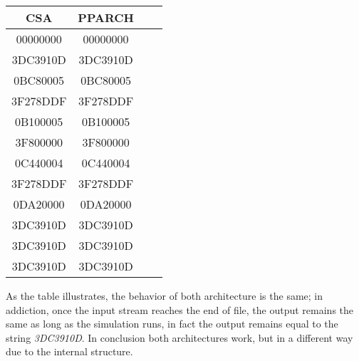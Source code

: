 \begin{table}[H]
\begin{center}
\begin{tabular}{|c|c|c|c|}				\hline
CSA		 	  & PPARCH 					\\ \hline
00000000   	  & 00000000               	\\ \hline
3DC3910D      & 3DC3910D                \\ \hline
0BC80005      & 0BC80005                \\ \hline
3F278DDF      & 3F278DDF                \\ \hline
0B100005      & 0B100005                  \\ \hline
3F800000      & 3F800000              \\ \hline
0C440004      & 0C440004                 \\ \hline
3F278DDF      & 3F278DDF                 \\ \hline
0DA20000      & 0DA20000                   \\ \hline
3DC3910D      & 3DC3910D                 \\ \hline
3DC3910D      & 3DC3910D                   \\ \hline
3DC3910D      & 3DC3910D                   \\ \hline
\end{tabular}
\end{center}
\end{table}

As the table illustrates, the behavior of both architecture is the same; in addiction, once the input stream reaches the end of file, the output remains the same as long as the simulation runs, in fact the output remains equal to the string \textit{3DC3910D}. In conclusion both architectures work, but in a different way due to the internal structure.


